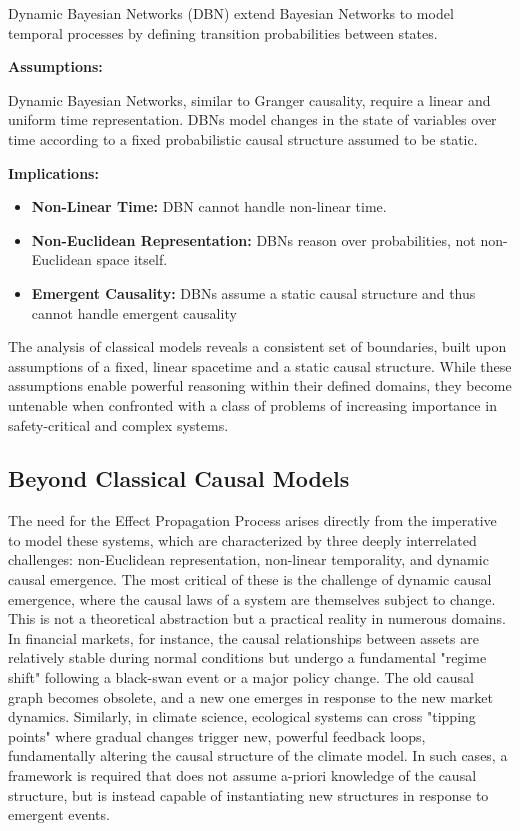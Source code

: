 Dynamic Bayesian Networks\cite{dagum1992dynamic} (DBN) extend Bayesian Networks to model temporal processes by defining transition probabilities between states.

\textbf{Assumptions:}

Dynamic Bayesian Networks, similar to Granger causality, require a linear and uniform time representation. DBNs model changes in the state of variables over time according to a fixed probabilistic causal structure assumed to be static.


\textbf{Implications:}

\begin{itemize}
    \item \textbf{Non-Linear Time:} DBN cannot handle non-linear time.
    \item \textbf{Non-Euclidean Representation:} DBNs reason over probabilities, not non-Euclidean space itself.
    \item \textbf{Emergent Causality:}  DBNs assume a static causal structure and thus cannot handle emergent causality
\end{itemize}

The analysis of classical models reveals a consistent set of boundaries, built upon assumptions of a fixed, linear spacetime and a static causal structure. While these assumptions enable powerful reasoning within their defined domains, they become untenable when confronted with a class of problems of increasing importance in safety-critical and complex systems. 

\subsection{Beyond Classical Causal Models}

The need for the Effect Propagation Process arises directly from the imperative to model these systems, which are characterized by three deeply interrelated challenges: non-Euclidean representation, non-linear temporality, and dynamic causal emergence. The most critical of these is the challenge of dynamic causal emergence, where the causal laws of a system are themselves subject to change. This is not a theoretical abstraction but a practical reality in numerous domains. 
In financial markets, for instance, the causal relationships between assets are relatively stable during normal conditions but undergo a fundamental "regime shift" following a black-swan event or a major policy change. The old causal graph becomes obsolete, and a new one emerges in response to the new market dynamics. 
Similarly, in climate science, ecological systems can cross "tipping points" where gradual changes trigger new, 
powerful feedback loops, fundamentally altering the causal structure of the climate model. 
In such cases, a framework is required that does not assume a-priori knowledge of the causal structure, 
but is instead capable of instantiating new structures in response to emergent events.

